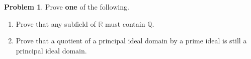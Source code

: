 \documentclass[11pt]{scrartcl}
\theoremstyle{definition}
\newtheorem{problem}[theorem]{Problem}
\begin{document}
\begin{problem}
Prove \textbf{one} of the following.
\begin{enumerate}[label=\rm{(\alph*)}]
\item Prove that any subfield of $\mathbb{R}$ must contain $\mathbb{Q}$.
\item Prove that a quotient of a principal ideal domain by a prime ideal is still a principal ideal domain.
\end{enumerate}
\end{problem}
\end{document}

